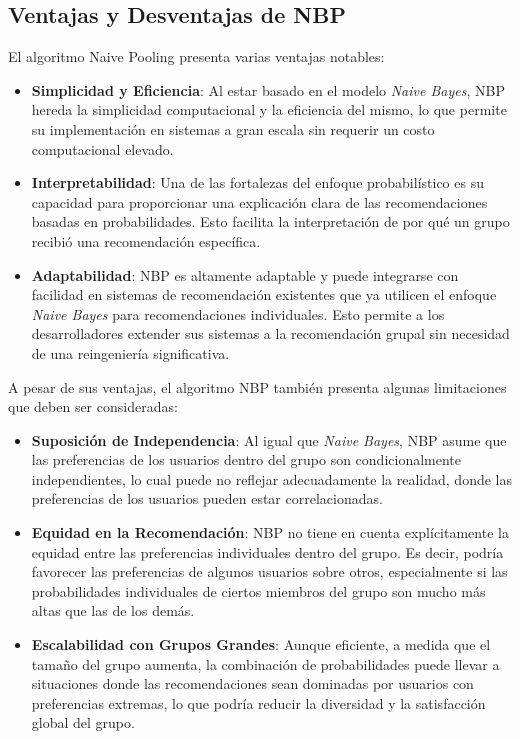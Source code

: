 \documentclass[runningheads,a4paper]{llncs}
\begin{document}
\subsection{Ventajas y Desventajas de NBP}

El algoritmo Naive Pooling presenta varias ventajas notables:
\begin{itemize}
    \item \textbf{Simplicidad y Eficiencia}: 
    Al estar basado en el modelo \textit{Naive Bayes}, 
    NBP hereda la simplicidad computacional y la 
    eficiencia del mismo, lo que permite su 
    implementación en sistemas a gran escala sin 
    requerir un costo computacional elevado.
    \item \textbf{Interpretabilidad}:
    Una de las fortalezas del enfoque probabilístico 
    es su capacidad para proporcionar una explicación 
    clara de las recomendaciones basadas en 
    probabilidades. Esto facilita la interpretación de 
    por qué un grupo recibió una recomendación 
    específica.
    \item \textbf{Adaptabilidad}:
    NBP es altamente adaptable y puede integrarse con 
    facilidad en sistemas de recomendación existentes 
    que ya utilicen el enfoque \textit{Naive Bayes} 
    para recomendaciones individuales. Esto permite a 
    los desarrolladores extender sus sistemas a la 
    recomendación grupal sin necesidad de una 
    reingeniería significativa.
\end{itemize}

A pesar de sus ventajas, el algoritmo NBP también 
presenta algunas limitaciones que deben ser consideradas:

\begin{itemize}
    \item \textbf{Suposición de Independencia}:
    Al igual que \textit{Naive Bayes}, NBP asume que 
    las preferencias de los usuarios dentro del grupo 
    son condicionalmente independientes, lo cual puede 
    no reflejar adecuadamente la realidad, donde las 
    preferencias de los usuarios pueden estar 
    correlacionadas.
    \item \textbf{Equidad en la Recomendación}:
    NBP no tiene en cuenta explícitamente la equidad 
    entre las preferencias individuales dentro del 
    grupo. Es decir, podría favorecer las preferencias 
    de algunos usuarios sobre otros, especialmente si 
    las probabilidades individuales de ciertos miembros 
    del grupo son mucho más altas que las de los demás.
    \item \textbf{Escalabilidad con Grupos Grandes}:
    Aunque eficiente, a medida que el tamaño del grupo 
    aumenta, la combinación de probabilidades puede 
    llevar a situaciones donde las recomendaciones 
    sean dominadas por usuarios con preferencias 
    extremas, lo que podría reducir la diversidad y la 
    satisfacción global del grupo.
\end{itemize}
\end{document}
